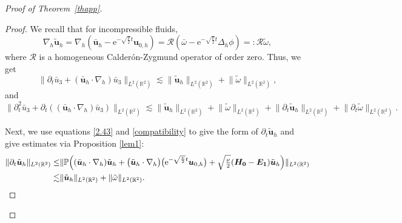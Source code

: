 \documentclass[pdflatex,sn-mathphys-num]{sn-jnl}%
\theoremstyle{thmstyleone}%
\theoremstyle{thmstyletwo}%
\theoremstyle{thmstylethree}%
\theoremstyle{thmstyletwo}
\begin{document}
\begin{proof}[Proof of Theorem~{\upshape\ref{thapp}}]
\begin{proof}
	We recall that for incompressible fluids, 
	\begin{equation*}
		\nabla_{h}
		\tilde{\boldsymbol{u}}_h=\nabla_{h}(\bar {\boldsymbol u}_h-\mathrm{e}^{-\sqrt{\frac\nu2}t}{\boldsymbol{u}}_{0,h})
		=\mathcal{R} (\bar{\omega}-\mathrm{e}^{-\sqrt{\frac\nu2}t}\Delta_h \phi)=:\mathcal{R}\tilde{\omega},
	\end{equation*}
	 where $\mathcal{R}$ is a homogeneous Calder\'{o}n-Zygmund operator of order zero. Thus, we get 
	\begin{equation*}\label{n4}
		\lVert
		\partial_t \bar{u}_3+(\bar{\boldsymbol{u}}_h\cdot\nabla_h)\bar{u}_3\rVert_{{L}^{2}(\mathbb{R}^2)}
		\lesssim
		\lVert
			\tilde{\boldsymbol{u}}_h
		\rVert_{{L}^{2}(\mathbb{R}^2)}
		+
		\lVert \tilde{\omega}
		\rVert_{{L}^{2}(\mathbb{R}^2)},
	\end{equation*}
and	
	\begin{equation*}\label{n16}
	\lVert
	\partial^2_t \bar{u}_3+\partial_t((\bar{\boldsymbol{u}}_h\cdot\nabla_h)\bar{u}_3)\rVert_{{L}^{2}(\mathbb{R}^2)}
	\lesssim
	\lVert
	\tilde{\boldsymbol{u}}_h
	\rVert_{{L}^{2}(\mathbb{R}^2)}
	+
	\lVert \tilde{\omega}
	\rVert_{{L}^{2}(\mathbb{R}^2)}
	+\lVert
	\partial_t\tilde{\boldsymbol{u}}_h
	\rVert_{{L}^{2}(\mathbb{R}^2)}
	+
	\lVert 
	\partial_t\tilde{\omega}
	\rVert_{{L}^{2}(\mathbb{R}^2)}.
\end{equation*}	
	
	
	
	




	
Next, we use equations \eqref{2.43} and \eqref{compatibility} to give the form of $\partial_t\tilde{\boldsymbol{u}}_h$ and give estimates via Proposition \ref{lem1}:	
\begin{align}\label{n17}
	\lVert 
	\partial_t\tilde{\boldsymbol{u}}_h
	\rVert_{{L}^{2}(\mathbb{R}^2)}
	\leq&
	\lVert
	\mathbb{P}\Big((\bar {\boldsymbol u}_h \cdot \nabla_h) \tilde{\boldsymbol{u}}_h
	+\big(\tilde{\boldsymbol{u}}_h\cdot\nabla_{ h}\big)\big(\mathrm{e}^{-\sqrt{\frac\nu2}t}{\boldsymbol{u}}_{0,h}\big)
	+\sqrt{\tfrac{\nu}{2}}
	(\boldsymbol{H_0}
	-\boldsymbol{E_1})
	\tilde{\boldsymbol{u}}_h\Big)
	\rVert_{{L}^{2}(\mathbb{R}^2)}\notag\\
	\lesssim&
	\lVert\tilde{\boldsymbol{u}}_h\rVert_{L^2(\mathbb{R}^2)}
	+\lVert\tilde{\omega}\rVert_{L^2(\mathbb{R}^2)}.
\end{align}
	

\end{proof}
\end{proof}
\end{document}
